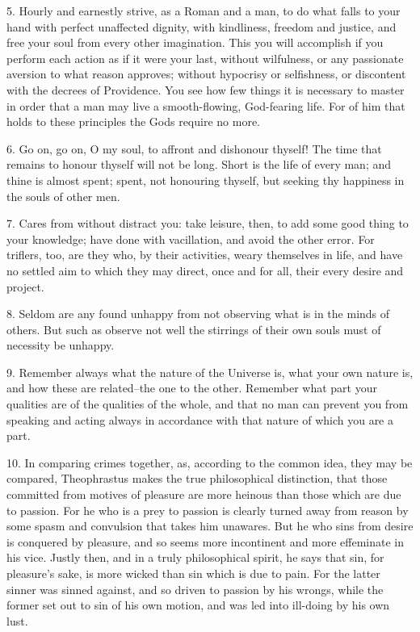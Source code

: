 \documentclass{book}
\begin{document}
5. Hourly and earnestly strive, as a Roman and a man, to do what falls
to your hand with perfect unaffected dignity, with kindliness, freedom
and justice, and free your soul from every other imagination. This you
will accomplish if you perform each action as if it were your last,
without wilfulness, or any passionate aversion to what reason
approves; without hypocrisy or selfishness, or discontent with the
decrees of Providence. You see how few things it is necessary to
master in order that a man may live a smooth-flowing, God-fearing
life. For of him that holds to these principles the Gods require no
more.

6. Go on, go on, O my soul, to affront and dishonour thyself! The time
that remains to honour thyself will not be long. Short is the life of
every man; and thine is almost spent; spent, not honouring thyself,
but seeking thy happiness in the souls of other men.

7. Cares from without distract you: take leisure, then, to add some
good thing to your knowledge; have done with vacillation, and avoid
the other error. For triflers, too, are they who, by their activities,
weary themselves in life, and have no settled aim to which they may
direct, once and for all, their every desire and project.

8. Seldom are any found unhappy from not observing what is in the
minds of others. But such as observe not well the stirrings of their
own souls must of necessity be unhappy.

9. Remember always what the nature of the Universe is, what your own
nature is, and how these are related--the one to the other. Remember
what part your qualities are of the qualities of the whole, and that
no man can prevent you from speaking and acting always in accordance
with that nature of which you are a part.

10. In comparing crimes together, as, according to the common idea,
they may be compared, Theophrastus makes the true philosophical
distinction, that those committed from motives of pleasure are more
heinous than those which are due to passion. For he who is a prey to
passion is clearly turned away from reason by some spasm and
convulsion that takes him unawares. But he who sins from desire is
conquered by pleasure, and so seems more incontinent and more
effeminate in his vice. Justly then, and in a truly philosophical
spirit, he says that sin, for pleasure's sake, is more wicked than sin
which is due to pain. For the latter sinner was sinned against, and so
driven to passion by his wrongs, while the former set out to sin of
his own motion, and was led into ill-doing by his own lust.
\end{document}
